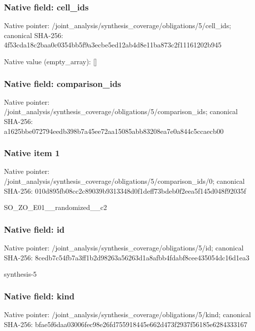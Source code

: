 \documentclass[10pt,a4paper]{article}
\begin{document}
\subsubsection{Native field: cell\_\allowbreak{}ids}
Native pointer: /joint\_\allowbreak{}analysis/synthesis\_\allowbreak{}coverage/obligations/5/cell\_\allowbreak{}ids; canonical SHA-256: 4f53cda18c2baa0c0354bb5f9a3ecbe5ed12ab4d8e11ba873c2f11161202b945

Native value (empty\_\allowbreak{}array): []

\subsubsection{Native field: comparison\_\allowbreak{}ids}
Native pointer: /joint\_\allowbreak{}analysis/synthesis\_\allowbreak{}coverage/obligations/5/comparison\_\allowbreak{}ids; canonical SHA-256: a1625bbe072794eedb398b7a45ee72aa15085abb83208ea7e0a844c5ccaecb00

\subsubsection{Native item 1}
Native pointer: /joint\_\allowbreak{}analysis/synthesis\_\allowbreak{}coverage/obligations/5/comparison\_\allowbreak{}ids/0; canonical SHA-256: 010d895fb08cc2c89039b9313348d0f1deff73bdeb0f2eea5f145d048f92035f

\begingroup\raggedright\sloppy SO\_\allowbreak{}ZO\_\allowbreak{}E01\_\allowbreak{}\_\allowbreak{}randomized\_\allowbreak{}\_\allowbreak{}c2\par\endgroup

\subsubsection{Native field: id}
Native pointer: /joint\_\allowbreak{}analysis/synthesis\_\allowbreak{}coverage/obligations/5/id; canonical SHA-256: 8cedb7c54fb7a3ff1b2d98263a56263d1a8afbb4fdabf8cee435054dc16d1ea3

\begingroup\raggedright\sloppy synthesis-5\par\endgroup

\subsubsection{Native field: kind}
Native pointer: /joint\_\allowbreak{}analysis/synthesis\_\allowbreak{}coverage/obligations/5/kind; canonical SHA-256: bfae5f6daa03006fec98e26fd755918445e662d473f2937f56185e6284333167
\end{document}
